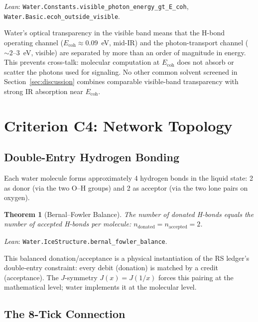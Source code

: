 \documentclass[12pt,a4paper]{article}
\newtheorem{theorem}{Theorem}[section]
\theoremstyle{definition}
\theoremstyle{remark}
\begin{document}
\noindent
\textit{Lean}: \texttt{Water.Constants.visible\_photon\_energy\_gt\_E\_coh},
\texttt{Water.Basic.ecoh\_outside\_visible}.

Water's optical transparency in the visible band means that the
H-bond operating channel ($E_{\mathrm{coh}} \approx 0.09$~eV, mid-IR)
and the photon-transport channel ($\sim 2$--$3$~eV, visible) are
separated by more than an order of magnitude in energy.  This prevents
cross-talk: molecular computation at $E_{\mathrm{coh}}$ does not
absorb or scatter the photons used for signaling.  No other common
solvent screened in Section~\ref{sec:discussion} combines comparable
visible-band transparency with strong IR absorption near
$E_{\mathrm{coh}}$.

\section{Criterion C4: Network Topology}
\label{sec:topology}

\subsection{Double-Entry Hydrogen Bonding}

Each water molecule forms approximately 4 hydrogen bonds in the liquid
state: 2 as donor (via the two O--H groups) and 2 as acceptor (via the
two lone pairs on oxygen).

\begin{theorem}[Bernal--Fowler Balance]
\label{thm:bernal_fowler}
The number of donated H-bonds equals the number of accepted H-bonds per
molecule:
$n_{\mathrm{donated}} = n_{\mathrm{accepted}} = 2$.
\end{theorem}

\noindent
\textit{Lean}: \texttt{Water.IceStructure.bernal\_fowler\_balance}.

This balanced donation/acceptance is a physical instantiation of the
RS ledger's double-entry constraint: every debit (donation) is matched
by a credit (acceptance).  The $J$-symmetry $J(x) = J(1/x)$ forces
this pairing at the mathematical level; water implements it at the
molecular level.

\subsection{The 8-Tick Connection}
\end{document}
